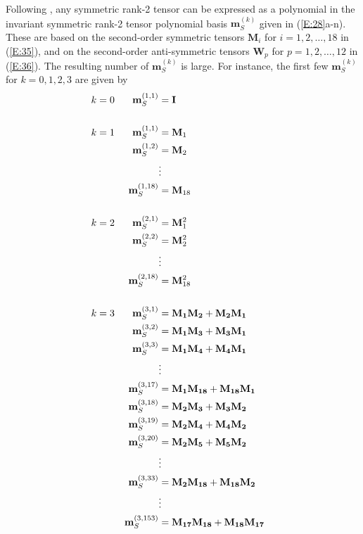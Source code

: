 Following , any symmetric rank-2 tensor can be expressed as a polynomial in the invariant symmetric rank-2 tensor polynomial basis  $\mathbf{m}^{(k)}_S$ given in (\ref{E:28}a-n).  These are based on the second-order symmetric tensors  $\mathbf{M}_i$ for $ i =1,2, \ldots ,18$ in (\ref{E:35}), and on the second-order anti-symmetric tensors $\mathbf{W}_p$  for $p =1,2, \ldots ,12$  in (\ref{E:36}).  The resulting number of $\mathbf{m}^{(k)}_S$ is large.  For instance, the first few  $\mathbf{m}^{(k)}_S$ for $k = 0, 1, 2, 3$ are given by 
%
\begin{subequations}
\label{E:38}
\begin{align}
	k &= 0  & \mathbf{m}^{(1,1)}_S   &= \mathbf{I} 				&   			\\[15pt]
	k &= 1  & \mathbf{m}^{(1,1)}_S   &= \mathbf{M}_1 			&   			\\
	  &     & \mathbf{m}^{(1,2)}_S   &= \mathbf{M}_2 			&   			\\
	  &	    &    				     &  \vdots  &   \notag 						\\
	  &     & \mathbf{m}^{(1,18)}_S  &= \mathbf{M}_{18} 		& 				\\[15pt]
	k &= 2  & \mathbf{m}^{(2,1)}_S   &= \mathbf{M}^2_1 			&   			\\  
	  &  	& \mathbf{m}^{(2,2)}_S   &= \mathbf{M}^2_2 			& 				\\
	  &     &  						 &  \vdots 	& 	\notag 						\\ 
	  &     & \mathbf{m}^{(2,18)}_S  &= \mathbf{M}^2_{18} 		& 				\\[15pt]   
	k &= 3  & \mathbf{m}^{(3,1)}_S   &= \mathbf{M_1M_2} + \mathbf{M_2M_1}  &   	\\  
	  &  	& \mathbf{m}^{(3,2)}_S   &= \mathbf{M_1M_3} + \mathbf{M_3M_1}  &   	\\  
	  &  	& \mathbf{m}^{(3,3)}_S   &= \mathbf{M_1M_4} + \mathbf{M_4M_1}  &   	\\  
	  &     &  						 &  \vdots 	& 	\notag \\ 
	  &  	& \mathbf{m}^{(3,17)}_S  &= \mathbf{M_1M_{18}} + \mathbf{M_{18}M_1} & \\ 
	  &  	& \mathbf{m}^{(3,18)}_S  &= \mathbf{M_2M_3} + \mathbf{M_3M_2}  &   	\\
	  &  	& \mathbf{m}^{(3,19)}_S  &= \mathbf{M_2M_4} + \mathbf{M_4M_2}  &   	\\  
	  &  	& \mathbf{m}^{(3,20)}_S  &= \mathbf{M_2M_5} + \mathbf{M_5M_2}  &   	\\
	  &     &  						 &  \vdots & 	\notag \\
	  &  	& \mathbf{m}^{(3,33)}_S  &= \mathbf{M_2M_{18}} + \mathbf{M_{18}M_2}  &  \\
	  &     &  						 &  \vdots 	& 	\notag \\
	  &  	& \mathbf{m}^{(3,153)}_S &= \mathbf{M_{17}M_{18}} + \mathbf{M_{18}M_{17}} &   
\end{align}
\end{subequations}
%
%    

